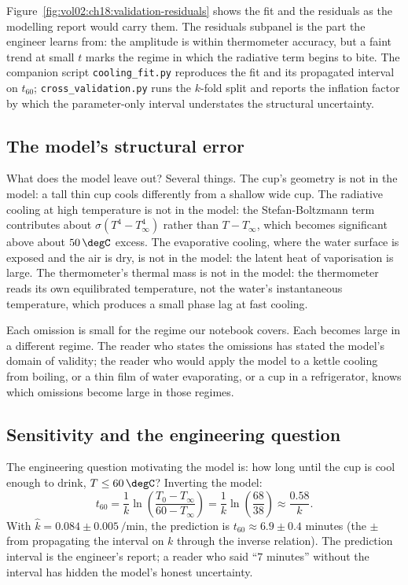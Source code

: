 

Figure~\ref{fig:vol02:ch18:validation-residuals} shows the fit and
the residuals as the modelling report would carry them. The
residuals subpanel is the part the engineer learns from: the
amplitude is within thermometer accuracy, but a faint trend at small
$t$ marks the regime in which the radiative term begins to bite.
The companion script \texttt{cooling\_fit.py} reproduces the fit and
its propagated interval on $t_{60}$; \texttt{cross\_validation.py}
runs the $k$-fold split and reports the inflation factor by which
the parameter-only interval understates the structural uncertainty.

\subsection{The model's structural error}

What does the model leave out? Several things. The cup's geometry
is not in the model: a tall thin cup cools differently from a
shallow wide cup. The radiative cooling at high temperature is not
in the model: the Stefan-Boltzmann term contributes about
$\sigma (T^{4} - T_{\infty}^{4})$ rather than $T - T_{\infty}$,
which becomes significant above about $50\,\degC$ excess. The
evaporative cooling, where the water surface is exposed and the
air is dry, is not in the model: the latent heat of vaporisation
is large. The thermometer's thermal mass is not in the model: the
thermometer reads its own equilibrated temperature, not the
water's instantaneous temperature, which produces a small phase
lag at fast cooling.

Each omission is small for the regime our notebook covers. Each
becomes large in a different regime. The reader who states the
omissions has stated the model's domain of validity; the reader
who would apply the model to a kettle cooling from boiling, or a
thin film of water evaporating, or a cup in a refrigerator, knows
which omissions become large in those regimes.

\subsection{Sensitivity and the engineering question}

The engineering question motivating the model is: how long until
the cup is cool enough to drink, $T \leq 60\,\degC$? Inverting the
model:
\[
t_{60} = \frac{1}{k} \ln\!\left(\frac{T_{0} - T_{\infty}}{60 - T_{\infty}}\right)
       = \frac{1}{k} \ln\!\left(\frac{68}{38}\right)
       \approx \frac{0.58}{k}.
\]
With $\hat k = 0.084 \pm 0.005\,\si{\per\minute}$, the prediction
is $t_{60} \approx 6.9 \pm 0.4$ minutes (the $\pm$ from propagating
the interval on $k$ through the inverse relation). The prediction
interval is the engineer's report; a reader who said ``$7$
minutes'' without the interval has hidden the model's honest
uncertainty.

